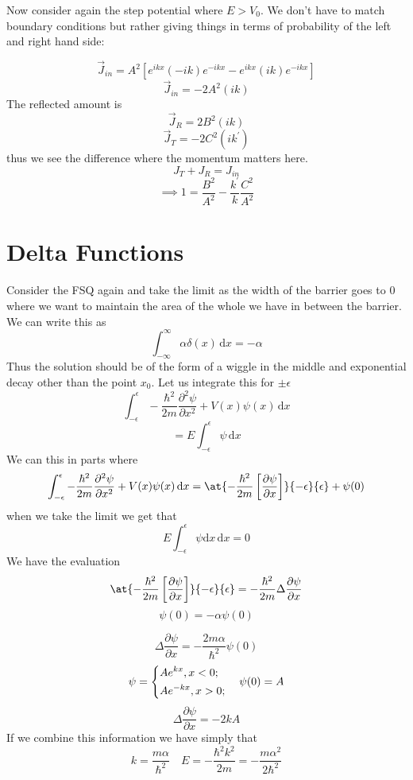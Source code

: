 Now consider again the step potential where \(E> V_0\). We don't have to match boundary conditions but rather giving things in terms of probability of the left and right hand side:

\[
	\vec{J}_{in} = A^{2}  \left[ e^{ikx} (-ik)e^{-ikx} - e^{ikx} (ik) e^{-ikx}   \right]   
\]
\[
	\vec{J}_{in} = - 2 A ^{2}  (ik)
\]
The reflected amount is 
\[
	\vec{J}_{R} = 2 B^{2} (ik) 
\]
\[
	\vec{J}_T = -2 C^{2}  (ik^{\prime} )
\]
thus we see the difference where the momentum matters here. 
\[
	J_T + J_R = J_{in} 
\]
\[
	\implies 1 = \frac{B^{2} }{A^{2} }- \frac{k^{\prime} }{k} \frac{C^{2} }{A^{2} }
\]

\section{Delta Functions}
Consider the FSQ again and take the limit as the width of the barrier goes to 0 where we want to maintain the area of the whole we have in between the barrier. We can write this as 
\[
	\int_{-\infty }^{\infty} \alpha \delta(x) \,\mathrm{d}x = -\alpha 
\]
Thus the solution should be of the form of a wiggle in the middle and exponential decay other than the point \(x_0\). Let us integrate this for \(\pm \epsilon \)
\[
	\int_{-\epsilon }^{\epsilon } - \frac{\hbar ^{2} }{2m} \frac{\partial ^{2} \psi }{\partial x^{2} } + V(x) \psi (x)  \,\mathrm{d}x 
\]  
\[
	= E \int_{-\epsilon }^{\epsilon } \psi   \,\mathrm{d}x 
\]
We can this in parts where
\[
	\int_{-\epsilon }^{\epsilon } - \frac{\hbar ^{2} }{2m} \frac{\partial ^{2} \psi }{\partial x^{2} } + V(x) \psi (x)  \,\mathrm{d}x = 
	\at{- \frac{\hbar ^{2} }{2m} \left[ \frac{\partial \psi }{\partial x}  \right]}{-\epsilon }{\epsilon } + \psi (0) 
\]  
when we take the limit we get that 
\[
	E \int_{-\epsilon }^{\epsilon } \psi \mathrm{d}x  \,\mathrm{d}x = 0  
\]
We have the evaluation 
\[
	\at{- \frac{\hbar ^{2} }{2m} \left[ \frac{\partial \psi }{\partial x}  \right]}{-\epsilon }{\epsilon} = - \frac{\hbar ^{2} }{2m} \Delta \frac{\partial \psi }{\partial x} 
\]
\[
	\psi (0) = - \alpha \psi (0)
\]

\[
	\Delta \frac{\partial \psi }{\partial x} = - \frac{2m \alpha}{\hbar ^{2} } \psi (0)
\]
\[
	\psi = \begin{dcases}
		Ae^{kx} , x < 0  ;\\
		Ae^{-kx} , x> 0  ;\\
	\end{dcases} \quad \psi (0) = A
\]
\[
	\Delta \frac{\partial \psi }{\partial x} = -2k A
\]
If we combine this information we have simply that 
\[
	k = \frac{m \alpha}{ \hbar ^{2} } \quad E = - \frac{\hbar ^{2}  k ^{2} }{2 m} = - \frac{m \alpha^{2} }{2 \hbar ^{2} }
\] 